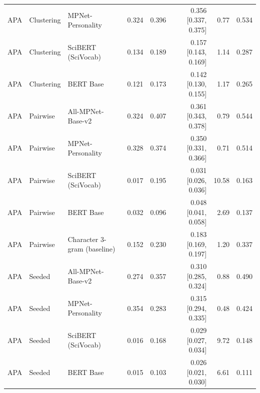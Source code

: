 \begin{table}[ht]
\begin{tabular}{lllrrrrr}
APA & Clustering & MPNet-Personality & 0.324 & 0.396 & 0.356 [0.337, 0.375] & 0.77 & 0.534 \\
APA & Clustering & SciBERT (SciVocab) & 0.134 & 0.189 & 0.157 [0.143, 0.169] & 1.14 & 0.287 \\
APA & Clustering & BERT Base & 0.121 & 0.173 & 0.142 [0.130, 0.155] & 1.17 & 0.265 \\
APA & Pairwise & All-MPNet-Base-v2 & 0.324 & 0.407 & 0.361 [0.343, 0.378] & 0.79 & 0.544 \\
APA & Pairwise & MPNet-Personality & 0.328 & 0.374 & 0.350 [0.331, 0.366] & 0.71 & 0.514 \\
APA & Pairwise & SciBERT (SciVocab) & 0.017 & 0.195 & 0.031 [0.026, 0.036] & 10.58 & 0.163 \\
APA & Pairwise & BERT Base & 0.032 & 0.096 & 0.048 [0.041, 0.058] & 2.69 & 0.137 \\
APA & Pairwise & Character 3-gram (baseline) & 0.152 & 0.230 & 0.183 [0.169, 0.197] & 1.20 & 0.337 \\
APA & Seeded & All-MPNet-Base-v2 & 0.274 & 0.357 & 0.310 [0.285, 0.324] & 0.88 & 0.490 \\
APA & Seeded & MPNet-Personality & 0.354 & 0.283 & 0.315 [0.294, 0.335] & 0.48 & 0.424 \\
APA & Seeded & SciBERT (SciVocab) & 0.016 & 0.168 & 0.029 [0.027, 0.034] & 9.72 & 0.148 \\
APA & Seeded & BERT Base & 0.015 & 0.103 & 0.026 [0.021, 0.030] & 6.61 & 0.111 \\
\bottomrule
\end{tabular}
\end{table}
